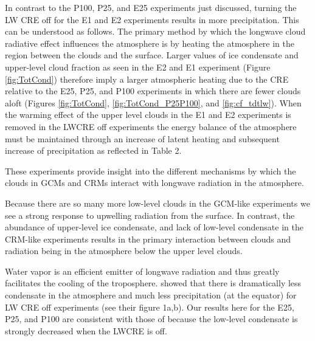 \documentclass[draft]{agujournal2019}
\begin{document}
In contrast to the P100, P25, and E25 experiments just discussed, turning the LW CRE off for 
the E1 and E2 experiments results in more precipitation.  This can be understood as follows.  
The primary method by which the longwave cloud radiative effect influences the atmosphere is by 
heating the atmosphere in the region between the clouds and the surface.  
Larger values of ice condensate and upper-level cloud fraction as seen in the E2 and E1 experiment 
(Figure \ref{fig:TotCond}) therefore imply a larger atmospheric heating due to the CRE relative to the 
E25, P25, and P100 experiments in which there are fewer clouds aloft (Figures \ref{fig:TotCond}, 
\ref{fig:TotCond_P25P100}, and \ref{fig:cf_tdtlw}).  When the warming effect of the upper level clouds 
in the E1 and E2 experiments is removed in the LWCRE off experiments the energy balance of 
the atmosphere must be maintained through an increase of latent heating and subsequent increase 
of precipitation as reflected in Table 2.  

These experiments provide insight into the different mechanisms by which the clouds in GCMs and CRMs
interact with longwave radiation in the atmosphere.  

Because there are so many more low-level clouds in 
the GCM-like experiments we see a strong response to upwelling radiation from the surface.  In contrast, 
the abundance of upper-level ice condensate, and lack of low-level condensate in the CRM-like experiments 
results in the primary interaction between clouds and radiation being in the atmosphere below the upper level clouds.       

%


Water vapor is an efficient emitter of longwave radiation and thus greatly facilitates the cooling of the troposphere.  
 showed that there is dramatically less condensate in the atmosphere and much less precipitation 
(at the equator) for LW CRE off experiments (see their figure 1a,b).  Our results here for the E25, P25, and P100 
are consistent with those of  because the low-level condensate is strongly decreased 
when the LWCRE is off.  
\end{document}
